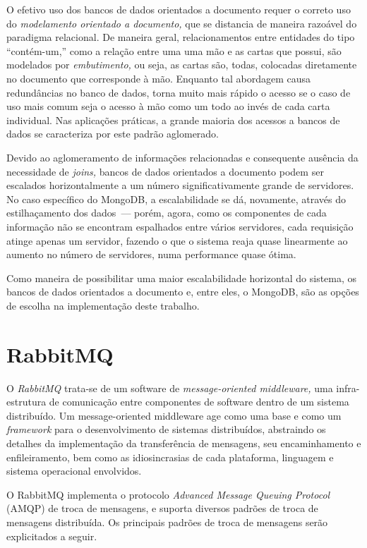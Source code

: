 \documentclass[ruledheader, 12pt]{abnt}
\begin{document}
O efetivo uso dos bancos de dados orientados a documento requer o correto uso do \emph{modelamento orientado a documento,} que se distancia de maneira razoável do paradigma relacional. De maneira geral, relacionamentos entre entidades do tipo ``contém-um,'' como a relação entre uma uma mão e as cartas que possui, são modelados por \emph{embutimento,} ou seja, as cartas são, todas, colocadas diretamente no documento que corresponde à mão. Enquanto tal abordagem causa redundâncias no banco de dados, torna muito mais rápido o acesso se o caso de uso mais comum seja o acesso à mão como um todo ao invés de cada carta individual. Nas aplicações práticas, a grande maioria dos acessos a bancos de dados se caracteriza por este padrão aglomerado.

Devido ao aglomeramento de informações relacionadas e consequente ausência da necessidade de \emph{joins,} bancos de dados orientados a documento podem ser escalados horizontalmente a um número significativamente grande de servidores. No caso específico do MongoDB, a escalabilidade se dá, novamente, através do estilhaçamento dos dados~--- porém, agora, como os componentes de cada informação não se encontram espalhados entre vários servidores, cada requisição atinge apenas um servidor, fazendo o que o sistema reaja quase linearmente ao aumento no número de servidores, numa performance quase ótima.

Como maneira de possibilitar uma maior escalabilidade horizontal do sistema, os bancos de dados orientados a documento e, entre eles, o MongoDB, são as opções de escolha na implementação deste trabalho.

\section{RabbitMQ}

O \emph{RabbitMQ} trata-se de um software de \emph{message-oriented middleware,} uma infra-estrutura de comunicação entre componentes de software dentro de um sistema distribuído. Um message-oriented middleware age como uma base e como um \emph{framework} para o desenvolvimento de sistemas distribuídos, abstraindo os detalhes da implementação da transferência de mensagens, seu encaminhamento e enfileiramento, bem como as idiosincrasias de cada plataforma, linguagem e sistema operacional envolvidos.


O RabbitMQ implementa o protocolo \emph{Advanced Message Queuing Protocol} (AMQP) de troca de mensagens, e suporta diversos padrões de troca de mensagens distribuída. Os principais padrões de troca de mensagens serão explicitados a seguir.
\end{document}

